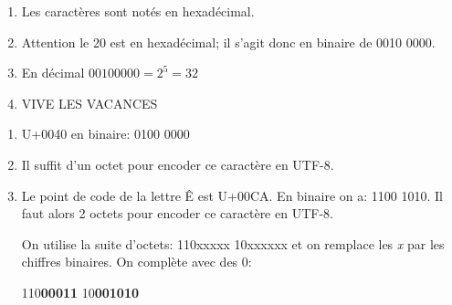 \documentclass[a4paper,11pt]{article}
\begin{document}
\begin{exo}
\begin{enumerate}
    \item Les caractères sont notés en hexadécimal.
    \item Attention le 20 est en hexadécimal; il s'agit donc en binaire de 0010 0000.
    \item En décimal $00100000 = 2^5 = 32$
    \item VIVE LES VACANCES
\end{enumerate}
\end{exo}
\begin{exo}
\begin{enumerate}
    \item U+0040 en binaire: 0100 0000
    \item Il suffit d'un octet pour encoder ce caractère en UTF-8.
    \item Le point de code de la lettre Ê est U+00CA. En binaire on a: 1100 1010. Il faut alors 2 octets pour encoder ce caractère en UTF-8.
    
    On utilise la suite d'octets: 110xxxxx 10xxxxxx et on remplace les \emph{x} par les chiffres binaires. On complète avec des 0:
\begin{center}
        110\textbf{00011} 10\textbf{001010}
    
\end{center}
\end{enumerate}
\end{exo}
\end{document}
